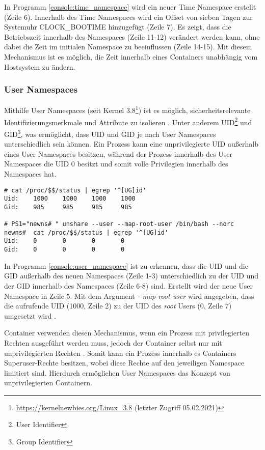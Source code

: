 In Programm  \ref{console:time_namespace} wird ein neuer Time Namespace
erstellt (Zeile 6). Innerhalb des Time Namespaces wird ein Offset von sieben
Tagen zur Systemuhr CLOCK\_BOOTIME  hinzugefügt (Zeile 7). Es zeigt, dass die
Betriebszeit innerhalb des Namespaces (Zeile 11-12) verändert werden kann, ohne
dabei die Zeit im initialen Namespace zu beeinflussen (Zeile 14-15). Mit diesem
Mechanismus ist es möglich, die Zeit innerhalb eines Containers unabhängig vom
Hostsystem zu ändern.

\subsubsection{User Namespaces}
\label{lab:user_namespaces}

Mithilfe User Namespaces (seit Kernel
3.8\footnote{\url{https://kernelnewbies.org/Linux_3.8} (letzter Zugriff
05.02.2021)})  ist es möglich, sicherheitsrelevante Identifizierungsmerkmale
und Attribute zu isolieren \cite{man_user_namespaces}. Unter anderem
UID\footnote{User Identifier} und GID\footnote{Group Identifier}, was
ermöglicht, dass UID und GID je nach User Namespaces unterschiedlich sein
können. Ein Prozess kann eine unprivilegierte UID au{\ss}erhalb eines User
Namespaces besitzen, während der Prozess innerhalb des User Namespaces die UID
0 besitzt und somit volle Privilegien innerhalb des Namespaces hat.
\clearpage
\begin{lstlisting}[label={console:user_namespace},caption={Beispiel für User Namespace}]
# cat /proc/$$/status | egrep '^[UG]id'
Uid:    1000    1000    1000    1000
Gid:    985     985     985     985

# PS1="newns# " unshare --user --map-root-user /bin/bash --norc
newns#  cat /proc/$$/status | egrep '^[UG]id'
Uid:    0       0       0       0
Gid:    0       0       0       0
\end{lstlisting}

In Programm \ref{console:user_namespace} ist zu erkennen, dass die UID und die GID
au{\ss}erhalb des neuen Namespaces (Zeile 1-3) unterschiedlich zu der UID und der
GID innerhalb des Namespaces (Zeile 6-8) sind. Erstellt wird der neue User
Namespace in Zeile 5. Mit dem Argument \mbox{\emph{-{}-map-root-user}} wird
angegeben, dass die aufrufende UID (1000, Zeile 2) zu der UID des \emph{root}
Users (0, Zeile 7) umgesetzt wird \cite{man_unshare_1}.

Container verwenden diesen Mechanismus, wenn ein Prozess mit 
privilegierten Rechten ausgeführt werden muss, jedoch der Container selbst nur
mit unprivilegierten Rechten \cite{dockerusernamespaces}. Somit kann ein
Prozess innerhalb es Containers Superuser-Rechte besitzen, wobei diese Rechte
auf den jeweiligen Namespace limitiert sind. Hierdurch ermöglichen User
Namespaces das Konzept von unprivilegierten Containern.

